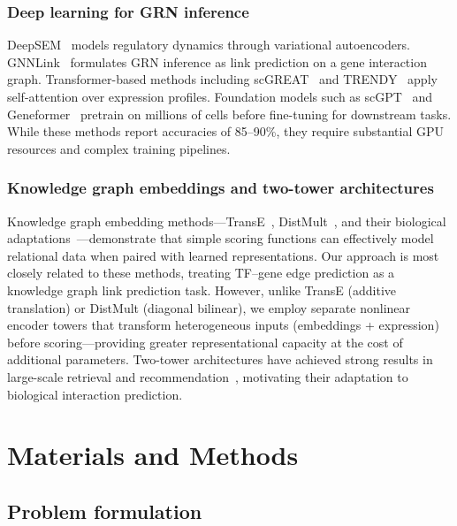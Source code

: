 \documentclass[10pt,twocolumn]{article}
\begin{document}
\subsubsection{Deep learning for GRN inference}
DeepSEM~\cite{shu2021modeling} models regulatory dynamics through variational autoencoders.
GNNLink~\cite{wang2023gnnlink} formulates GRN inference as link prediction on a gene interaction graph.
Transformer-based methods including scGREAT~\cite{chen2024scgreat} and TRENDY~\cite{yuan2025trendy} apply self-attention over expression profiles.
Foundation models such as scGPT~\cite{cui2024scgpt} and Geneformer~\cite{theodoris2023transfer} pretrain on millions of cells before fine-tuning for downstream tasks.
While these methods report accuracies of 85--90\%, they require substantial GPU resources and complex training pipelines.

\subsubsection{Knowledge graph embeddings and two-tower architectures}
Knowledge graph embedding methods---TransE~\cite{bordes2013translating}, DistMult~\cite{yang2015embedding}, and their biological adaptations~\cite{mohamed2020biological,bonner2022review}---demonstrate that simple scoring functions can effectively model relational data when paired with learned representations.
Our approach is most closely related to these methods, treating TF--gene edge prediction as a knowledge graph link prediction task.
However, unlike TransE (additive translation) or DistMult (diagonal bilinear), we employ separate nonlinear encoder towers that transform heterogeneous inputs (embeddings + expression) before scoring---providing greater representational capacity at the cost of additional parameters.
Two-tower architectures have achieved strong results in large-scale retrieval and recommendation~\cite{yi2019sampling}, motivating their adaptation to biological interaction prediction.

\section{Materials and Methods}
\label{sec:methods}

\subsection{Problem formulation}
\label{sec:problem}
\end{document}
